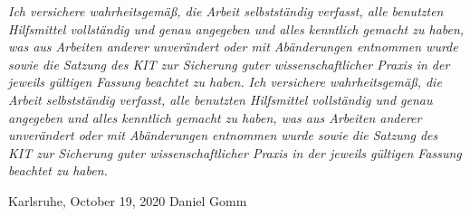 \mbox{}\thispagestyle{empty}

\vspace*{1cm}

{\Large \textbf{}} 

\bigskip

{
\textit{Ich versichere wahrheitsgemäß, die Arbeit selbstständig verfasst, alle benutzten Hilfsmittel vollständig und genau angegeben und alles kenntlich gemacht zu haben, was aus Arbeiten anderer unverändert oder mit Abänderungen entnommen wurde sowie die Satzung des KIT zur Sicherung guter wissenschaftlicher Praxis in der jeweils gültigen Fassung beachtet zu haben.}}
{
\textit{Ich versichere wahrheitsgemäß, die Arbeit selbstständig verfasst, alle benutzten Hilfsmittel vollständig und genau angegeben und alles kenntlich gemacht zu haben, was aus Arbeiten anderer unverändert oder mit Abänderungen entnommen wurde sowie die Satzung des KIT zur Sicherung guter wissenschaftlicher Praxis in der jeweils gültigen Fassung beachtet zu haben.}}

\vspace{1cm}

%
%
%
%
Karlsruhe, October 19, 2020 \hfill Daniel Gomm


